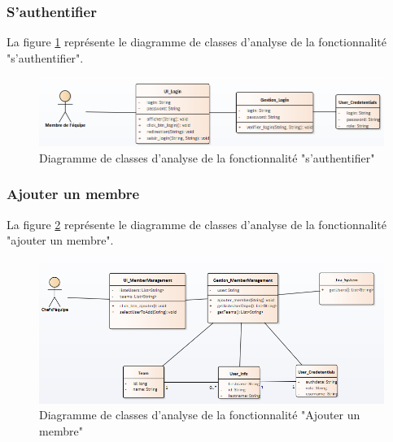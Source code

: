 \subsubsection{S'authentifier}
La figure \ref{code60} représente le diagramme de classes d'analyse de la fonctionnalité "s'authentifier".
\begin{figure}[H]
  \centering
 \includegraphics[scale=0.69]{figures/diagrams/class/authentification_class_diag.png}
 \caption{Diagramme de classes d'analyse de la fonctionnalité "s'authentifier"}
 \label{code60}
\end{figure}

\subsubsection{Ajouter un membre}
La figure \ref{code61} représente le diagramme de classes d'analyse de la fonctionnalité "ajouter un membre".
\begin{figure}[H]
  \centering
 \includegraphics[scale=0.69]{figures/diagrams/class/addmember_class_diag.png}
 \caption{Diagramme de classes d'analyse de la fonctionnalité "Ajouter un membre"}
 \label{code61}
\end{figure}

